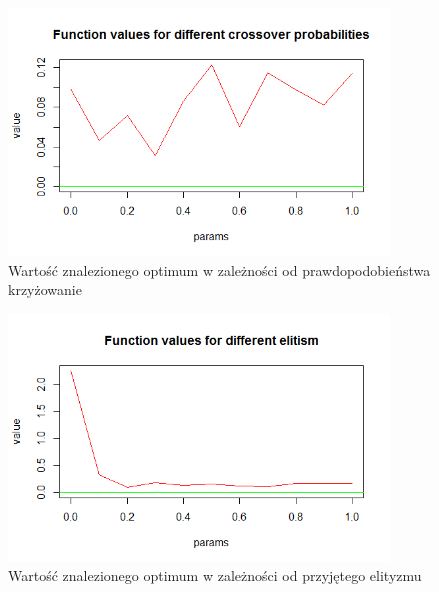\documentclass[11pt, a4paper]{article}
\begin{document}
\begin{figure}[H]
	\begin{center}
		\includegraphics[width=0.9\textwidth]{./assets/gulf3.png} %
		\caption{Wartość znalezionego optimum w zależności od prawdopodobieństwa krzyżowanie}
		\label{fig:gulf3}
	\end{center}
\end{figure}

\begin{figure}[H]
	\begin{center}
		\includegraphics[width=0.9\textwidth]{./assets/gulf4.png} %
		\caption{Wartość znalezionego optimum w zależności od przyjętego elityzmu}
		\label{fig:gulf4}
	\end{center}
\end{figure}
\end{document}

